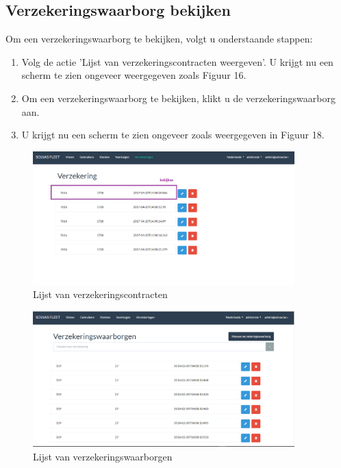 \documentclass[11pt,openany]{article}
\begin{document}
\subsection{Verzekeringswaarborg bekijken}
	Om een verzekeringswaarborg te bekijken, volgt u onderstaande stappen:
	\begin{enumerate}
		\item Volg de actie 'Lijst van verzekeringscontracten weergeven'. U krijgt nu een scherm te zien ongeveer weergegeven zoals Figuur 16.
		\item Om een verzekeringswaarborg te bekijken, klikt u de verzekeringswaarborg aan. 
		\item U krijgt nu een scherm te zien ongeveer zoals weergegeven in Figuur 18.
	\end{enumerate}

\begin{figure}
	\centering
	\includegraphics[width=0.9\textwidth]{img/fig_o.png}
	\caption{Lijst van verzekeringscontracten}
\end{figure}

\begin{figure}
	\centering
	\includegraphics[width=0.9\textwidth]{img/fig_p.png}
	\caption{Lijst van verzekeringswaarborgen}
\end{figure}
\end{document}
